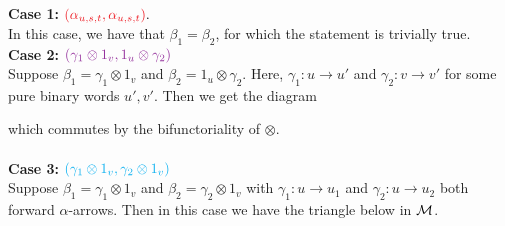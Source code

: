 \begin{prf}
        \noindent\textbf{Case 1:} $\textcolor{Red}{(\alpha_{u,s,t}, \alpha_{u,s,t})}.$\\
        In this case, we have that $\beta_1 =  \beta_2$, for which the statement is trivially true.
        \\

        \noindent\textbf{Case 2:} $\textcolor{Purple}{(\gamma_1\otimes 1_v ,1_u \otimes \gamma_2)}$\\
        Suppose $\beta_1 = \gamma_1 \otimes 1_v$ and $\beta_2 = 1_u\otimes \gamma_2$. 
        Here, $\gamma_1: u \to u'$ and $\gamma_2: v \to  v'$ for some pure binary 
        words $ u',v'$. Then we get the diagram 
        \begin{center}
        \end{center}
        which commutes by the bifunctoriality of $\otimes$. 
        \\
        \\
        \textbf{Case 3:} $\textcolor{ProcessBlue}{(\gamma_1\otimes 1_v, \gamma_2\otimes 1_v)}$\\
        Suppose $\beta_1 = \gamma_1 \otimes 1_v$ and $\beta_2 = \gamma_2 \otimes 1_v$
        with $\gamma_1: u \to u_1$ and $\gamma_2: u \to u_2$ both forward $\alpha$-arrows.
        Then in this case we have the triangle below in $\mathcal{M}$.
        \begin{center}
\end{center}
\end{prf}
